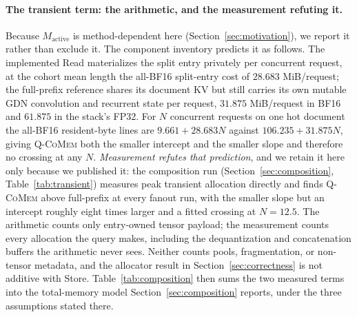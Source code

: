 \documentclass{article}
\newcommand{\qcomem}{\textsc{Q-CoMem}}
\begin{document}
\paragraph{The transient term: the arithmetic, and the measurement refuting it.}
Because $M_{\mathrm{active}}$ is method-dependent here
(Section~\ref{sec:motivation}), we report it rather than exclude it.  The
component inventory predicts it as follows.  The implemented Read materializes
the split entry privately per concurrent request, at the cohort mean length the
all-BF16 split-entry cost of $28.683$ MiB/request; the full-prefix reference
shares its document KV but still carries its own mutable GDN convolution and
recurrent state per request, $31.875$ MiB/request in BF16 and $61.875$ in the
stack's FP32.  For $N$ concurrent requests on one hot document the all-BF16
resident-byte lines are $9.661+28.683N$ against $106.235+31.875N$, giving
\qcomem{} both the smaller intercept and the smaller slope and therefore no
crossing at any $N$.  \emph{Measurement refutes that prediction}, and we retain
it here only because we published it: the composition run
(Section~\ref{sec:composition}, Table~\ref{tab:transient}) measures peak
transient allocation directly and finds \qcomem{} above full-prefix at every
fanout run, with the smaller slope but an intercept roughly eight times larger
and a fitted crossing at $N=12.5$.  The arithmetic counts only entry-owned
tensor payload; the measurement counts every allocation the query makes,
including the dequantization and concatenation buffers the arithmetic never
sees.  Neither counts pools, fragmentation, or non-tensor metadata, and the
allocator result in Section~\ref{sec:correctness} is not additive with Store.
Table~\ref{tab:composition} then sums the two measured terms into the
total-memory model Section~\ref{sec:composition} reports, under the three
assumptions stated there.


\end{document}
